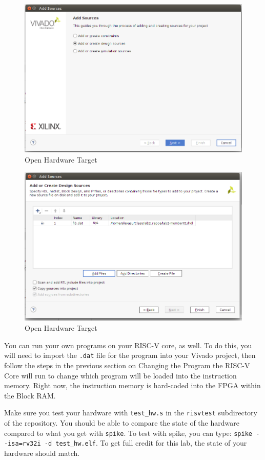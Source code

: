 \documentclass{article}
\begin{document}
\begin{figure}[h!]
  \centering
  \includegraphics[width=0.8\linewidth]{add_sources}
  \caption{Open Hardware Target}
  \label{fig:addsources}
\end{figure}
\begin{figure}[h!]
  \centering
  \includegraphics[width=0.8\linewidth]{copy_sources}
  \caption{Open Hardware Target}
  \label{fig:copysources}
\end{figure}
You can run your own programs on your RISC-V core, as well.  To do this, you will
need to import the \verb|.dat| file for the program into your Vivado project,
then follow the steps in the previous section on Changing the Program the RISC-V
Core will run to change which program will be loaded into the instruction
memory.  Right now, the instruction memory is hard-coded into the FPGA
within the Block RAM.

Make sure you test your hardware with \verb!test_hw.s! in the
\verb!risvtest! subdirectory of the repository.  You should be able to
compare the state of the hardware compared to what you get with
\verb!spike!.  To test with spike, you can type:
\verb!spike --isa=rv32i -d test_hw.elf!.  To get full credit for this
lab, the state of your hardware should match.
\end{document}
